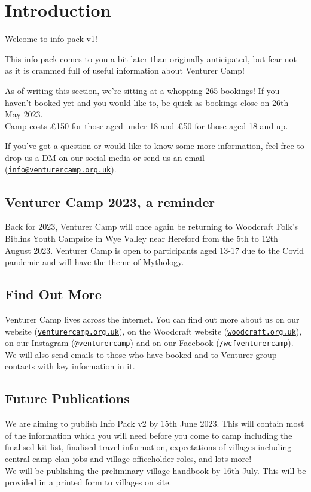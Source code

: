 \documentclass[a4paper, 11pt]{report}
\newcommand{\nl}{\newline}
\begin{document}
\tableofcontents
\chapter{Introduction}
Welcome to info pack v1!\nl

This info pack comes to you a bit later than originally anticipated, but fear not as it is crammed full of useful information about Venturer Camp!\nl

As of writing this section, we're sitting at a whopping 265 bookings! If you haven't booked yet and you would like to, be quick as bookings close on 26th May 2023.\\
Camp costs £150 for those aged under 18 and £50 for those aged 18 and up.\nl

If you've got a question or would like to know some more information, feel free to drop us a DM on our social media or send us an email (\href{mailto:info@venturercamp.org.uk}{\texttt{info@venturercamp.org.uk}}).

\section{Venturer Camp 2023, a reminder}
Back for 2023, Venturer Camp will once again be returning to Woodcraft Folk's Biblins Youth Campsite in Wye Valley near Hereford from the 5th to 12th August 2023. Venturer Camp is open to participants aged 13-17 due to the Covid pandemic and will have the theme of Mythology. 

\section{Find Out More}
Venturer Camp lives across the internet. You can find out more about us on our website (\href{https://venturercamp.org.uk}{\texttt{venturercamp.org.uk}}), on the Woodcraft website (\href{https://woodcraft.org.uk}{\texttt{woodcraft.org.uk}}), on our Instagram (\href{https://www.instagram.com/venturercamp/}{\texttt{@venturercamp}}) and on our Facebook (\href{https://www.facebook.com/wcfventurercamp}{\texttt{/wcfventurercamp}}).
We will also send emails to those who have booked and to Venturer group contacts with key information in it.

\section{Future Publications}
We are aiming to publish Info Pack v2 by 15th June 2023. This will contain most of the information which you will need before you come to camp including the finalised kit list, finalised travel information, expectations of villages including central camp clan jobs and village officeholder roles, and lots more!\\
We will be publishing the preliminary village handbook by 16th July. This will be provided in a printed form to villages on site. 
\end{document}
